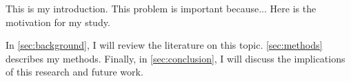 This is my introduction. This problem is important because... Here is the motivation for my study.

In \ref{sec:background}, I will review the literature on this topic. \ref{sec:methods} describes my methods.
Finally, in \ref{sec:conclusion}, I will discuss the implications of this research and future work.
